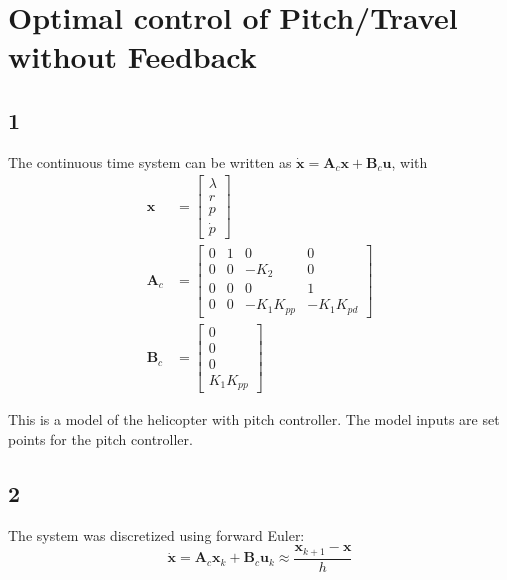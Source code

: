 
\section{Optimal control of Pitch/Travel without Feedback}
\subsection{1}
The continuous time system can be written as $\mathbf{\dot{x}} = \mathbf{A}_c\mathbf{x}+ \mathbf{B}_c\mathbf{u}$, with
\begin{subequations}
    \begin{align}
        \mathbf{x} &= \begin{bmatrix}
            \lambda\\
            r\\
            p\\
            \dot{p}
        \end{bmatrix}\\
        \mathbf{A}_c &= \begin{bmatrix}
            0 & 1 & 0 & 0\\
            0 & 0 & -K_2 & 0\\
            0 & 0 & 0 & 1\\
            0 & 0& -K_1K_{pp} & -K_1K_{pd}
        \end{bmatrix} \\
        \mathbf{B}_c &= \begin{bmatrix}
            0\\
            0\\
            0\\
            K_1K_{pp}
        \end{bmatrix}
    \end{align}
\end{subequations}

This is a model of the helicopter with pitch controller. The model inputs are set points for the pitch controller.

\subsection{2}
The system was discretized using forward Euler:
\begin{equation}
    \mathbf{\dot{x}} = \mathbf{A}_c\mathbf{x}_k + \mathbf{B}_c\mathbf{u}_k \approx \frac{\mathbf{x}_{k+1}-\mathbf{x}}{h}
\end{equation}

